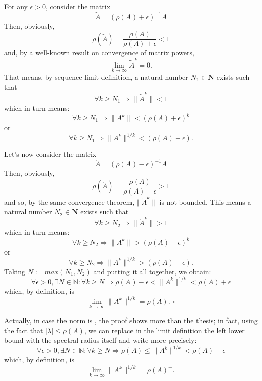 \documentclass[12pt]{article}
\begin{document}
For any $\epsilon>0$, consider the matrix 
\[
\tilde{A}=(\rho(A)+\epsilon)^{-1}A
\]
Then, obviously,
\[
\rho(\tilde{A}) = \frac{\rho(A)}{\rho(A)+\epsilon}<1
\]
and, by a well-known result on convergence of matrix powers,
\[
\lim_{k \to \infty}\tilde{A}^k=0.
\]
That means, by sequence limit definition, a natural number $N_1\in \mathbf{N}$ exists such that
\[
\forall k\geq N_1 \Rightarrow \|\tilde{A}^k\| < 1
\]
which in turn means:
\[
\forall k\geq N_1 \Rightarrow \|A^k\| < (\rho(A)+\epsilon)^k
\]
or 
\[
\forall k\geq N_1 \Rightarrow \|A^k\|^{1/k} < (\rho(A)+\epsilon).
\]

Let's now consider the matrix 
\[
\check{A}=(\rho(A)-\epsilon)^{-1}A
\]
Then, obviously,
\[
\rho(\check{A}) = \frac{\rho(A)}{\rho(A)-\epsilon}>1
\]
and so, by the same convergence theorem,$\|\check{A}^k\|$ is not bounded.
This means a natural number $N_2\in \mathbf{N}$ exists such that
\[
\forall k\geq N_2 \Rightarrow \|\check{A}^k\|>1
\]
which in turn means:
\[
\forall k\geq N_2 \Rightarrow \|A^k\| > (\rho(A)-\epsilon)^k
\]
or 
\[
\forall k\geq N_2 \Rightarrow \|A^k\|^{1/k} > (\rho(A)-\epsilon).
\]
Taking $N:=max(N_1,N_2)$ and putting it all together, we obtain:
\[
\forall \epsilon>0, \exists N\in\mathbb{N}: \forall k\geq N \Rightarrow \rho(A)-\epsilon < \|A^k\|^{1/k} < \rho(A)+\epsilon
\]
which, by definition, is
\[
\lim_{k \to \infty}\|A^k\|^{1/k} = \rho(A).\,\,\square
\]

Actually, in case the norm is , the proof shows more than the thesis; in fact, using the fact that $|\lambda|\leq\rho(A)$, we can replace in the limit definition the left lower bound with the spectral radius itself and write more precisely:
\[
\forall \epsilon>0, \exists N\in\mathbb{N}: \forall k\geq N \Rightarrow \rho(A) \leq \|A^k\|^{1/k} < \rho(A)+\epsilon
\]
which, by definition, is
\[\lim_{k \to \infty}\|A^k\|^{1/k} = \rho(A)^+.
\]
\end{document}
